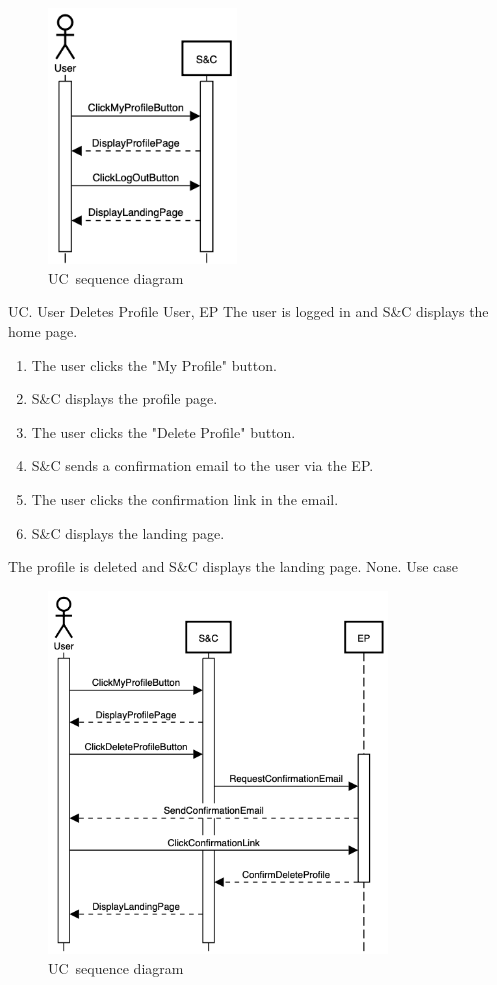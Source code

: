 \begin{figure}[h]
    \centering
    \includegraphics[width=5cm]{images/sequence-diagrams/user-logs-out.png}
    \caption{UC\theuc\ sequence diagram}
\end{figure}


\clearpage

\begin{usecase}
    {UC\theuc. User Deletes Profile}
    {User, EP}
    {The user is logged in and S\&C displays the home page.}
    {\begin{enumerate}[leftmargin=*]
        \item The user clicks the "My Profile" button.
        \item S\&C displays the profile page.
        \item The user clicks the "Delete Profile" button.
        \item S\&C sends a confirmation email to the user via the EP.
        \item The user clicks the confirmation link in the email.
        \item S\&C displays the landing page.
    \end{enumerate}}
    {The profile is deleted and S\&C displays the landing page.}
    {None.}
    {Use case \theuc}
\end{usecase}

\begin{figure}[h]
    \centering
    \includegraphics[width=9cm]{images/sequence-diagrams/user-deletes-profile.png}
    \caption{UC\theuc\ sequence diagram}
\end{figure}

